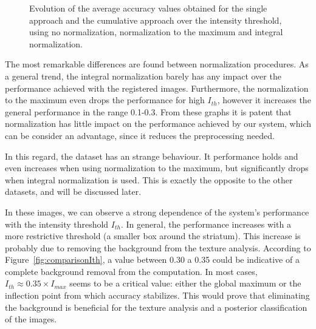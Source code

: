 \begin{figure}
	\caption[Evolution of the average accuracy with the intensity threshold.]{Evolution of the average accuracy values obtained for the single approach and the cumulative approach over the intensity threshold, using no normalization, normalization to the maximum and integral normalization.}
	\label{fig:featuresIth}
\end{figure}

The most remarkable differences are found between normalization procedures. As a general trend, the integral normalization barely has any impact over the performance achieved with the registered images. Furthermore, the normalization to the maximum even drops the performance for high $I_{th}$, however it increases the general performance in the range 0.1-0.3. From these graphs it is patent that normalization has little impact on the performance achieved by our system, which can be consider an advantage, since it reduces the preprocessing needed. 

In this regard, the \vdlvdat{} dataset has an strange behaviour. It performance holds and even increases when using normalization to the maximum, but significantly drops when integral normalization is used. This is exactly the opposite to the other datasets, and will be discussed later.  

In these images, we can observe a strong dependence of the system's performance with the intensity threshold $I_{th}$. In general, the performance increases with a more restrictive threshold (a smaller box around the striatum). This increase is probably due to removing the background from the texture analysis. According to Figure~\ref{fig:comparisonIth}, a value between 0.30 a 0.35 could be indicative of a complete background removal from the computation. In most cases, $I_{th}\approx 0.35\times I_{max}$ seems to be a critical value: either the global maximum or the inflection point from which accuracy stabilizes. This would prove that eliminating the background is beneficial for the texture analysis and a posterior classification of the images. 

